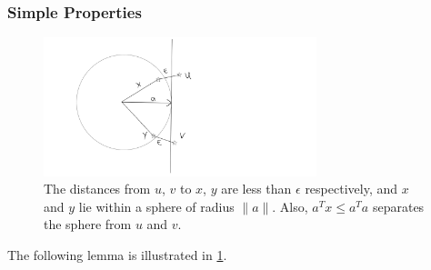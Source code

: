 \subsubsection{Simple Properties}


\begin{figure}[ht]
	\centering
	\includegraphics[width=300px]{images/first_lemma.png}
	\caption[
    		A depiction of the quantities within \cref{properties_of_a_circle}.]{
			The distances from $u$, $v$ to $x$, $y$ are less than $\epsilon$ respectively, and $x$ and $y$ lie within a sphere of radius $\|a\|$.
			Also, $a^Tx \le a^Ta$ separates the sphere from $u$ and $v$.
	}
	\label{first_lemma}
\end{figure}
The following lemma is illustrated in \cref{first_lemma}.
